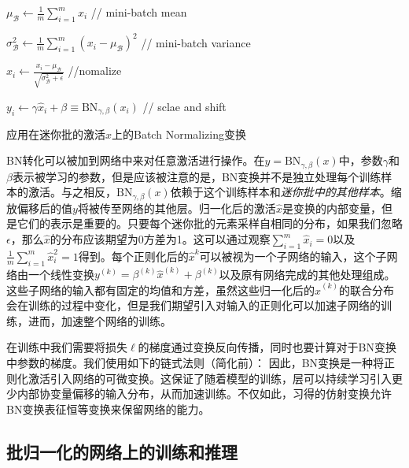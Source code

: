 \documentclass[../main.tex]{subfile}
\begin{document}
\begin{algorithm}[H]
    $\mu_\mathcal{B} \gets \frac{1}{m}\sum_{i=1}^m x_i$       // mini-batch mean

    $\sigma_\mathcal{B}^2 \gets \frac{1}{m}\sum_{i=1}^m \left( x_i  - \mu_\mathcal{B} \right)^2$ // mini-batch variance

    $\hat{x}_i \gets \frac{x_i - \mu_\mathcal{B}}{\sqrt{\sigma_\mathcal{B}^2 + \epsilon}}$ //nomalize

    $y_i \gets \gamma\hat{x}_i + \beta \equiv \text{BN}_{\gamma,\beta}\left( x_i \right)$ // sclae and shift
    \caption{应用在迷你批的激活$x$上的Batch Normalizing变换}
    \label{alg1}
\end{algorithm}

BN转化可以被加到网络中来对任意激活进行操作。在$y = \text{BN}_{\gamma,\beta}\left(x\right)$中，参数$\gamma$和$\beta$表示被学习的参数，但是应该被注意的是，BN变换并不是独立处理每个训练样本的激活。与之相反，$\text{BN}_{\gamma,\beta}\left(x\right)$依赖于这个训练样本和\textit{迷你批中的其他样本}。缩放偏移后的值$y$将被传至网络的其他层。归一化后的激活$\hat{x}$是变换的内部变量，但是它们的表示是重要的。只要每个迷你批的元素采样自相同的分布，如果我们忽略$\epsilon$，那么$\hat{x}$的分布应该期望为0方差为1。这可以通过观察$\sum_{i=1}^m \hat{x}_i = 0$以及$\frac{1}{m}\sum_{i=1}^m \hat{x}_i^2 = 1$得到。每个正则化后的$\hat{x}^k$可以被视为一个子网络的输入，这个子网络由一个线性变换$y^{\left(k\right)} = \beta^{\left(k\right)}\hat{x}^{\left(k\right)} + \beta^{\left(k\right)}$以及原有网络完成的其他处理组成。这些子网络的输入都有固定的均值和方差，虽然这些归一化后的$\hat{x}^{\left(k\right)}$的联合分布会在训练的过程中变化，但是我们期望引入对输入的正则化可以加速子网络的训练，进而，加速整个网络的训练。

在训练中我们需要将损失$\ell$的梯度通过变换反向传播，同时也要计算对于BN变换中参数的梯度。我们使用如下的链式法则（简化前）：
因此，BN变换是一种将正则化激活引入网络的可微变换。这保证了随着模型的训练，层可以持续学习引入更少内部协变量偏移的输入分布，从而加速训练。不仅如此，习得的仿射变换允许BN变换表征恒等变换来保留网络的能力。

\subsection{批归一化的网络上的训练和推理}
\end{document}
